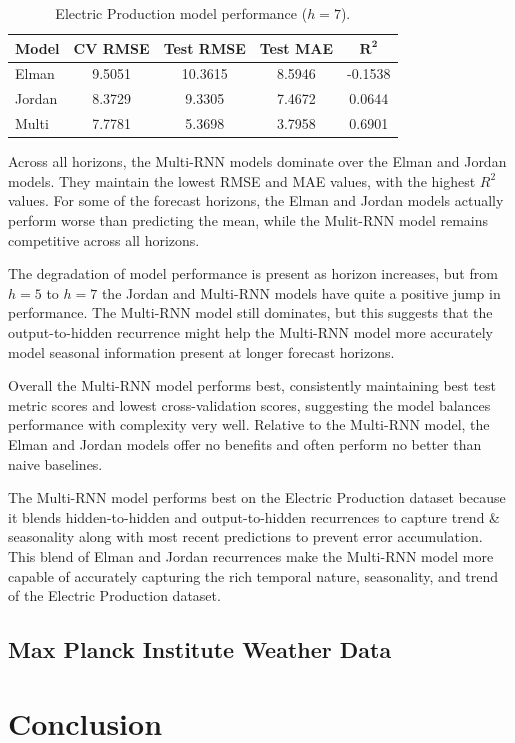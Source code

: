\documentclass[conference]{IEEEtran}
\begin{document}
\begin{table}[H]
\centering
\caption{Electric Production model performance ($h=7$).}
\label{tab:ep_h7}
\begin{tabular}{lcccc}
\toprule
\textbf{Model} & \textbf{CV RMSE} & \textbf{Test RMSE} & \textbf{Test MAE} & $\mathbf{R^2}$ \\
\midrule
Elman  & 9.5051 & 10.3615 & 8.5946 & -0.1538 \\
Jordan & 8.3729 & 9.3305  & 7.4672 & 0.0644 \\
Multi  & 7.7781 & 5.3698  & 3.7958 & 0.6901 \\
\bottomrule
\end{tabular}
\end{table}

Across all horizons, the Multi-RNN models dominate over the Elman and Jordan models. They maintain the lowest RMSE and MAE values, with the highest $R^2$ values. For some of the forecast horizons, the Elman and Jordan models actually perform worse than predicting the mean, while the Mulit-RNN model remains competitive across all horizons.

The degradation of model performance is present as horizon increases, but from $h=5$ to $h=7$ the Jordan and Multi-RNN models have quite a positive jump in performance. The Multi-RNN model still dominates, but this suggests that the output-to-hidden recurrence might help the Multi-RNN model more accurately model seasonal information present at longer forecast horizons.

Overall the Multi-RNN model performs best, consistently maintaining best test metric scores and lowest cross-validation scores, suggesting the model balances performance with complexity very well. Relative to the Multi-RNN model, the Elman and Jordan models offer no benefits and often perform no better than naive baselines.

The Multi-RNN model performs best on the Electric Production dataset because it blends hidden-to-hidden and output-to-hidden recurrences to capture trend \& seasonality along with most recent predictions to prevent error accumulation. This blend of Elman and Jordan recurrences make the Multi-RNN model more capable of accurately capturing the rich temporal nature, seasonality, and trend of the Electric Production dataset.

\subsection{\textbf{Max Planck Institute Weather Data}}

\section{\textbf{Conclusion}}



\vspace{12pt}
\end{document}
